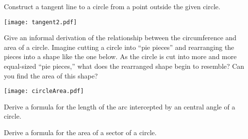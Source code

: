 \documentclass{ximera}
\begin{document}
\begin{problem}
Construct a tangent line to a circle from a point outside the given circle.
\begin{image}
\texttt{[image: tangent2.pdf]}
\end{image}
\end{problem}

\begin{problem}
Give an informal derivation of the relationship between the circumference and area of a circle.  Imagine cutting a circle into ``pie pieces'' and rearranging the pieces into a shape like the one below.  As the circle is cut into more and more equal-sized ``pie pieces,'' what does the rearranged shape begin to resemble?  Can you find the area of this shape?  
\begin{image}
\texttt{[image: circleArea.pdf]}
\end{image}
\end{problem}

\begin{problem}
Derive a formula for the length of the arc intercepted by an central angle of a circle.  
\end{problem}

\begin{problem}
Derive a formula for the area of a sector of a circle.  
\end{problem}

\end{document}
